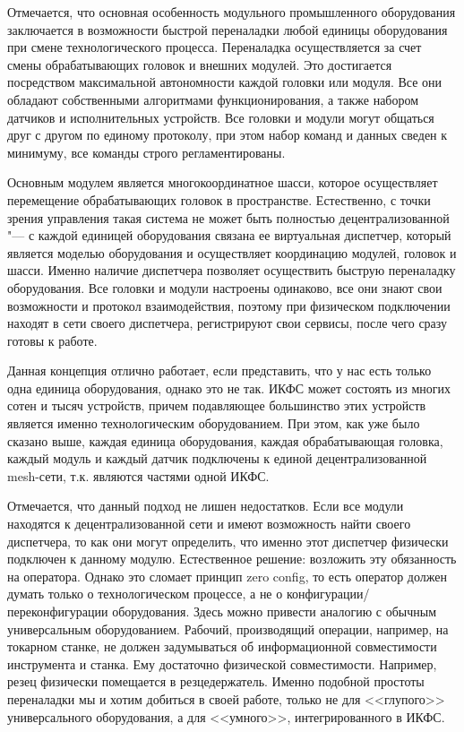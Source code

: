 Отмечается, что основная особенность модульного промышленного оборудования заключается в возможности быстрой переналадки любой единицы оборудования при смене технологического процесса. Переналадка осуществляется за счет смены обрабатывающих головок и внешних модулей.  Это достигается посредством максимальной автономности каждой головки или модуля. Все они обладают собственными алгоритмами функционирования, а также набором датчиков и исполнительных устройств. Все головки и модули могут общаться друг с другом по единому протоколу, при этом набор команд и данных сведен к минимуму, все команды строго регламентированы.

Основным модулем является многокоординатное шасси, которое осуществляет перемещение обрабатывающих головок в пространстве. Естественно, с точки зрения управления такая система не может быть полностью децентрализованной "--- с каждой единицей оборудования связана ее виртуальная диспетчер, который является моделью оборудования и осуществляет координацию модулей, головок и шасси. Именно наличие диспетчера позволяет осуществить быструю переналадку оборудования. Все головки и модули настроены одинаково, все они знают свои возможности и протокол взаимодействия, поэтому при физическом подключении находят в сети своего диспетчера, регистрируют свои сервисы, после чего сразу готовы к работе.

Данная концепция отлично работает, если представить, что у нас есть только одна единица оборудования, однако это не так. ИКФС может состоять из многих сотен и тысяч устройств, причем подавляющее большинство этих устройств является именно технологическим оборудованием. При этом, как уже было сказано выше, каждая единица оборудования, каждая обрабатывающая головка, каждый модуль и каждый датчик подключены к единой децентрализованной mesh-сети, т.\:к. являются частями одной ИКФС.

Отмечается, что данный подход не лишен недостатков. Если все модули находятся к децентрализованной сети и имеют возможность найти своего диспетчера, то как они могут определить, что именно этот диспетчер физически подключен к данному модулю. Естественное решение: возложить эту обязанность на оператора. Однако это сломает принцип zero config, то есть оператор должен думать только о технологическом процессе, а не о конфигурации/переконфигурации оборудования. Здесь можно привести аналогию с обычным универсальным оборудованием. Рабочий, производящий операции, например, на токарном станке, не должен задумываться об информационной совместимости инструмента и станка. Ему достаточно физической совместимости. Например, резец физически помещается в резцедержатель. Именно подобной простоты переналадки мы и хотим добиться в своей работе, только не для <<глупого>> универсального оборудования, а для <<умного>>, интегрированного в ИКФС.

